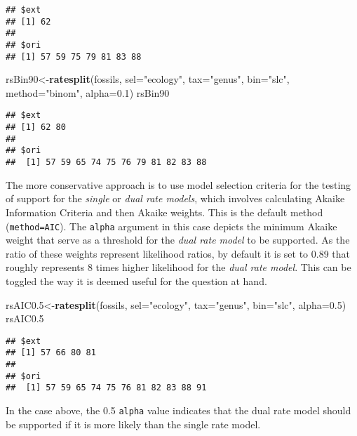 \documentclass[]{article}
\newenvironment{Shaded}{\begin{snugshade}}{\end{snugshade}}
\newcommand{\DataTypeTok}[1]{\textcolor[rgb]{0.13,0.29,0.53}{#1}}
\newcommand{\FloatTok}[1]{\textcolor[rgb]{0.00,0.00,0.81}{#1}}
\newcommand{\KeywordTok}[1]{\textcolor[rgb]{0.13,0.29,0.53}{\textbf{#1}}}
\newcommand{\NormalTok}[1]{#1}
\newcommand{\StringTok}[1]{\textcolor[rgb]{0.31,0.60,0.02}{#1}}
\begin{document}
\begin{verbatim}
## $ext
## [1] 62
## 
## $ori
## [1] 57 59 75 79 81 83 88
\end{verbatim}

\begin{Shaded}
\begin{Highlighting}[]
\NormalTok{rsBin90<-}\KeywordTok{ratesplit}\NormalTok{(fossils, }\DataTypeTok{sel=}\StringTok{"ecology"}\NormalTok{, }\DataTypeTok{tax=}\StringTok{"genus"}\NormalTok{, }
  \DataTypeTok{bin=}\StringTok{"slc"}\NormalTok{, }\DataTypeTok{method=}\StringTok{"binom"}\NormalTok{, }\DataTypeTok{alpha=}\FloatTok{0.1}\NormalTok{)}
\NormalTok{rsBin90}
\end{Highlighting}
\end{Shaded}

\begin{verbatim}
## $ext
## [1] 62 80
## 
## $ori
##  [1] 57 59 65 74 75 76 79 81 82 83 88
\end{verbatim}

The more conservative approach is to use model selection criteria for
the testing of support for the \emph{single } or \emph{dual rate
models}, which involves calculating Akaike Information Criteria and then
Akaike weights. This is the default method (\texttt{method=AIC}). The
\texttt{alpha} argument in this case depicts the minimum Akaike weight
that serve as a threshold for the \emph{dual rate model} to be
supported. As the ratio of these weights represent likelihood ratios, by
default it is set to 0.89 that roughly represents 8 times higher
likelihood for the \emph{dual rate model}. This can be toggled the way
it is deemed useful for the question at hand.

\begin{Shaded}
\begin{Highlighting}[]
\NormalTok{rsAIC0}\FloatTok{.5}\NormalTok{<-}\KeywordTok{ratesplit}\NormalTok{(fossils, }\DataTypeTok{sel=}\StringTok{"ecology"}\NormalTok{, }\DataTypeTok{tax=}\StringTok{"genus"}\NormalTok{, }
  \DataTypeTok{bin=}\StringTok{"slc"}\NormalTok{, }\DataTypeTok{alpha=}\FloatTok{0.5}\NormalTok{)}
\NormalTok{rsAIC0}\FloatTok{.5}
\end{Highlighting}
\end{Shaded}

\begin{verbatim}
## $ext
## [1] 57 66 80 81
## 
## $ori
##  [1] 57 59 65 74 75 76 81 82 83 88 91
\end{verbatim}

In the case above, the 0.5 \texttt{alpha} value indicates that the dual
rate model should be supported if it is more likely than the single rate
model.
\end{document}
